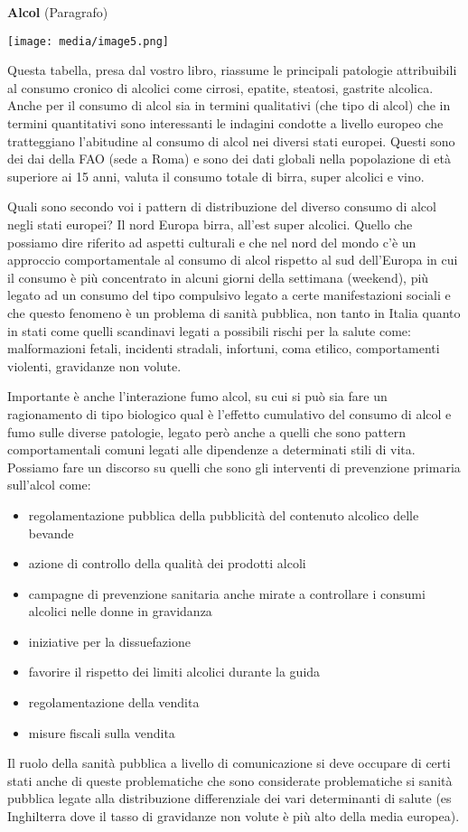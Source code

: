 \documentclass[]{article}
\begin{document}
\textbf{Alcol} (Paragrafo)

\texttt{[image: media/image5.png]}

Questa tabella, presa dal vostro libro, riassume le principali patologie
attribuibili al consumo cronico di alcolici come cirrosi, epatite,
steatosi, gastrite alcolica. Anche per il consumo di alcol sia in
termini qualitativi (che tipo di alcol) che in termini quantitativi sono
interessanti le indagini condotte a livello europeo che tratteggiano
l'abitudine al consumo di alcol nei diversi stati europei. Questi sono
dei dai della FAO (sede a Roma) e sono dei dati globali nella
popolazione di età superiore ai 15 anni, valuta il consumo totale di
birra, super alcolici e vino.

Quali sono secondo voi i pattern di distribuzione del diverso consumo di
alcol negli stati europei? Il nord Europa birra, all'est super alcolici.
Quello che possiamo dire riferito ad aspetti culturali e che nel nord
del mondo c'è un approccio comportamentale al consumo di alcol rispetto
al sud dell'Europa in cui il consumo è più concentrato in alcuni giorni
della settimana (weekend), più legato ad un consumo del tipo compulsivo
legato a certe manifestazioni sociali e che questo fenomeno è un
problema di sanità pubblica, non tanto in Italia quanto in stati come
quelli scandinavi legati a possibili rischi per la salute come:
malformazioni fetali, incidenti stradali, infortuni, coma etilico,
comportamenti violenti, gravidanze non volute.

Importante è anche l'interazione fumo alcol, su cui si può sia fare un
ragionamento di tipo biologico qual è l'effetto cumulativo del consumo
di alcol e fumo sulle diverse patologie, legato però anche a quelli che
sono pattern comportamentali comuni legati alle dipendenze a determinati
stili di vita. Possiamo fare un discorso su quelli che sono gli
interventi di prevenzione primaria sull'alcol come:

\begin{itemize}
\item
  regolamentazione pubblica della pubblicità del contenuto alcolico
  delle bevande
\item
  azione di controllo della qualità dei prodotti alcoli
\item
  campagne di prevenzione sanitaria anche mirate a controllare i consumi
  alcolici nelle donne in gravidanza
\item
  iniziative per la dissuefazione
\item
  favorire il rispetto dei limiti alcolici durante la guida
\item
  regolamentazione della vendita
\item
  misure fiscali sulla vendita
\end{itemize}

Il ruolo della sanità pubblica a livello di comunicazione si deve
occupare di certi stati anche di queste problematiche che sono
considerate problematiche si sanità pubblica legate alla distribuzione
differenziale dei vari determinanti di salute (es Inghilterra dove il
tasso di gravidanze non volute è più alto della media europea).
\end{document}
